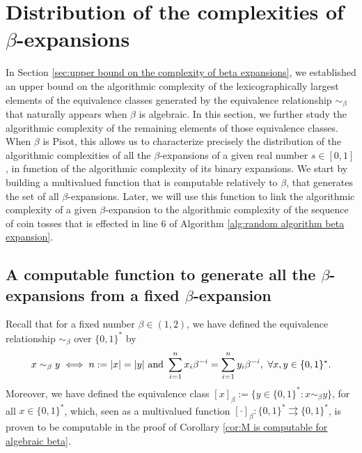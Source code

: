 
\section{\texorpdfstring{Distribution of the complexities of $\beta$-expansions}{}}

\label{sec:distribution of the complexities of beta expansions}

In Section \ref{sec:upper bound on the complexity of beta expansions}, we established an upper bound on the algorithmic complexity of the lexicographically largest elements of the equivalence classes generated by the equivalence relationship $\sim_\beta$ that naturally appears when $\beta$ is algebraic. In this section, we further study the algorithmic complexity of the remaining elements of those equivalence classes. When $\beta$ is Pisot, this allows us to characterize precisely the distribution of the algorithmic complexities of all the $\beta$-expansions of a given real number $s \in [0,1]$, in function of the algorithmic complexity of its binary expansions. We start by building a multivalued function that is computable relatively to $\beta$, that generates the set of all $\beta$-expansions. Later, we will use this function to link the algorithmic complexity of a given $\beta$-expansion to the algorithmic complexity of the sequence of coin tosses that is effected in line 6 of Algorithm \ref{alg:random algorithm beta expansion}. 

\subsection{\texorpdfstring{A computable function to generate all the $\beta$-expansions from a fixed $\beta$-expansion}{}}

Recall that for a fixed number $\beta \in (1,2)$, we have defined the equivalence relationship $\sim_\beta$ over $\{0,1\}^\ast$ by 
\begin{equation}
    x \sim_\beta y \iff n := \len x = |y| \ \text{and} \ \sum_{i=1}^n x_i \beta^{-i} = \sum_{i=1}^n y_i \beta^{-i}, \ \forall x,y \in \{0,1\}^\ast.
\end{equation}
Moreover, we have defined the equivalence class $[x]_\beta := \{y \in \{0,1\}^\ast : x \sim_\beta y\}$, for all $x \in \{0,1\}^\ast$, which, seen as a multivalued function $[\cdot]_\beta : \{0,1\}^\ast \rightrightarrows \{0,1\}^\ast$, is proven to be computable in the proof of Corollary \ref{cor:M is computable for algebraic beta}. 

